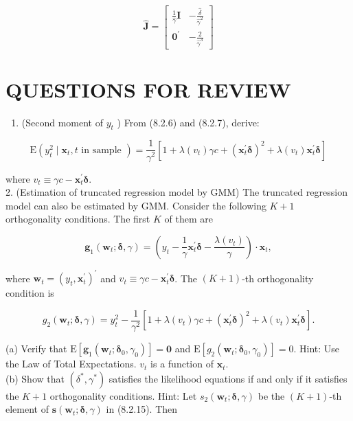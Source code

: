 \documentclass[10pt]{article}
\begin{document}
\[
\widehat{\mathbf{J}}=\left[\begin{array}{cc}
\frac{1}{\hat{\gamma}} \mathbf{I} & -\frac{\hat{\delta}}{\hat{\gamma}^{2}}  \tag{8.2.18}\\
\mathbf{0}^{\prime} & -\frac{2}{\hat{\gamma}^{3}}
\end{array}\right]
\]

\section*{QUESTIONS FOR REVIEW}
\begin{enumerate}
  \item (Second moment of $y_{t}$ ) From (8.2.6) and (8.2.7), derive:
\end{enumerate}

$$
\mathrm{E}\left(y_{t}^{2} \mid \mathbf{x}_{t}, t \text { in sample }\right)=\frac{1}{\gamma^{2}}\left[1+\lambda\left(v_{t}\right) \gamma c+\left(\mathbf{x}_{t}^{\prime} \boldsymbol{\delta}\right)^{2}+\lambda\left(v_{t}\right) \mathbf{x}_{t}^{\prime} \boldsymbol{\delta}\right]
$$

where $v_{t} \equiv \gamma c-\mathbf{x}_{t}^{\prime} \boldsymbol{\delta}$.\\
2. (Estimation of truncated regression model by GMM) The truncated regression model can also be estimated by GMM. Consider the following $K+1$ orthogonality conditions. The first $K$ of them are


\begin{equation*}
\mathbf{g}_{1}\left(\mathbf{w}_{t} ; \boldsymbol{\delta}, \gamma\right)=\left(y_{t}-\frac{1}{\gamma} \mathbf{x}_{t}^{\prime} \boldsymbol{\delta}-\frac{\lambda\left(v_{t}\right)}{\gamma}\right) \cdot \mathbf{x}_{t}, \tag{8.2.19}
\end{equation*}


where $\mathbf{w}_{t}=\left(y_{t}, \mathbf{x}_{t}^{\prime}\right)^{\prime}$ and $v_{t} \equiv \gamma c-\mathbf{x}_{t}^{\prime} \boldsymbol{\delta}$. The $(K+1)$-th orthogonality condition is


\begin{equation*}
g_{2}\left(\mathbf{w}_{t} ; \boldsymbol{\delta}, \gamma\right)=y_{t}^{2}-\frac{1}{\gamma^{2}}\left[1+\lambda\left(v_{t}\right) \gamma c+\left(\mathbf{x}_{t}^{\prime} \boldsymbol{\delta}\right)^{2}+\lambda\left(v_{t}\right) \mathbf{x}_{t}^{\prime} \boldsymbol{\delta}\right] . \tag{8.2.20}
\end{equation*}


(a) Verify that $\mathrm{E}\left[\mathbf{g}_{1}\left(\mathbf{w}_{t} ; \boldsymbol{\delta}_{0}, \gamma_{0}\right)\right]=\mathbf{0}$ and $\mathrm{E}\left[g_{2}\left(\mathbf{w}_{t} ; \boldsymbol{\delta}_{0}, \gamma_{0}\right)\right]=0$. Hint: Use the Law of Total Expectations. $v_{t}$ is a function of $\mathbf{x}_{t}$.\\
(b) Show that $\left(\delta^{*}, \gamma^{*}\right)$ satisfies the likelihood equations if and only if it satisfies the $K+1$ orthogonality conditions. Hint: Let $s_{2}\left(\mathbf{w}_{t} ; \boldsymbol{\delta}, \gamma\right)$ be the $(K+1)$-th\\
element of $\mathbf{s}\left(\mathbf{w}_{t} ; \boldsymbol{\delta}, \gamma\right)$ in (8.2.15). Then
\end{document}
